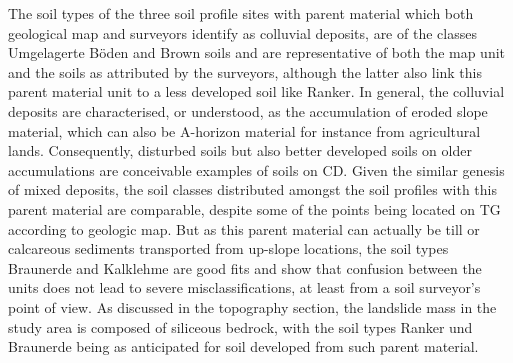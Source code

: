 \documentclass[preprint,12pt,authoryear]{elsarticle}
\begin{document}
The soil types of the three soil profile sites with parent material which both geological map and surveyors identify as colluvial deposits, are of the classes Umgelagerte B\"oden and Brown soils and are representative of both the map unit and the soils as attributed by the surveyors, although the latter also link this parent material unit to a less developed soil like Ranker. In general, the colluvial deposits are characterised, or understood, as the accumulation of eroded slope material, which can also be A-horizon material  for instance from agricultural lands. Consequently, disturbed soils but also better developed soils on older accumulations are  conceivable examples of soils on CD.  
Given the similar genesis of mixed deposits, the soil classes distributed amongst the soil profiles with this parent material are comparable, despite some of the points being located on TG according to geologic map. But as this parent material can actually be till or calcareous sediments transported from up-slope locations, the soil types Braunerde and Kalklehme are good fits and show that confusion between the units does not lead to severe misclassifications, at least from a soil surveyor's point of view.    
As discussed in the topography section, the landslide mass in the study area is composed of siliceous bedrock, with the soil types Ranker und Braunerde being as anticipated for soil developed from such parent material. 
\end{document}

